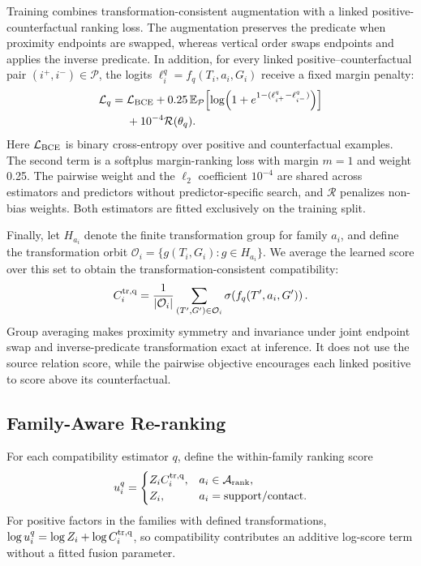 Training combines transformation-consistent augmentation with a linked positive-counterfactual ranking loss. The augmentation preserves the predicate when proximity endpoints are swapped, whereas vertical order swaps endpoints and applies the inverse predicate. In addition, for every linked positive--counterfactual pair $(i^+,i^-)\in\mathcal P$, the logits $\ell_i^q=f_q(T_i,a_i,G_i)$ receive a fixed margin penalty:
\begin{equation}
\begin{aligned}
\mathcal L_q={}&\mathcal L_{\rm BCE}
+0.25\,\mathbb E_{\mathcal P}\!
 \left[\log\!\left(1+e^{1-(\ell^q_{i^+}-\ell^q_{i^-})}\right)\right]\\
&+10^{-4}\mathcal R(\theta_q).
\end{aligned}
\end{equation}
Here $\mathcal L_{\rm BCE}$ is binary cross-entropy over positive and counterfactual examples. The second term is a softplus margin-ranking loss with margin $m=1$ and weight 0.25. The pairwise weight and the $\ell_2$ coefficient $10^{-4}$ are shared across estimators and predictors without predictor-specific search, and $\mathcal R$ penalizes non-bias weights.  
Both estimators are fitted exclusively on the training split. 

Finally, let $H_{a_i}$ denote the finite transformation group for family $a_i$, and define the transformation orbit $\mathcal O_i=\{g(T_i,G_i):g\in H_{a_i}\}$. We average the learned score over this set to obtain the transformation-consistent compatibility:
\begin{equation}
C_i^{\rm tr,q}=\frac{1}{|\mathcal O_i|}
\sum_{(T',G')\in\mathcal O_i} \sigma\!\left(f_q(T',a_i,G')\right).
\label{eq:algebra-projection}
\end{equation}
Group averaging makes proximity symmetry and invariance under joint endpoint swap and inverse-predicate transformation exact at inference. It does not use the source relation score, while the pairwise objective encourages each linked positive to score above its counterfactual.

\subsection{Family-Aware Re-ranking}
For each compatibility estimator $q$, define the within-family ranking score
\begin{equation}
u_i^q=\begin{cases}
Z_iC_i^{\rm tr,q}, & a_i\in\mathcal A_{\rm rank},\\
Z_i, & a_i=\mathrm{support/contact}.
\end{cases}
\end{equation}
For positive factors in the families with defined transformations, $\log u_i^q=\log Z_i+\log C_i^{\rm tr,q}$, so compatibility contributes an additive log-score term without a fitted fusion parameter. 

